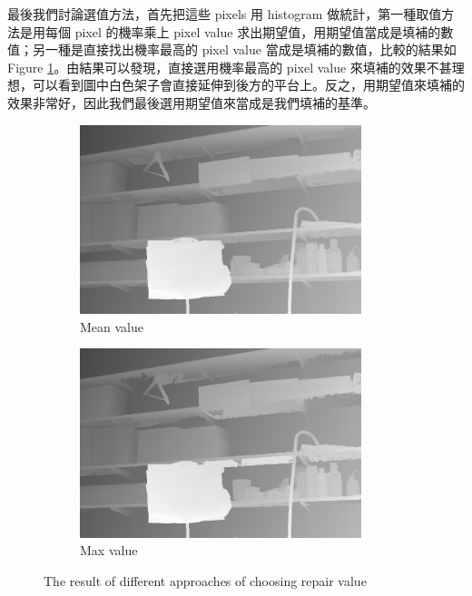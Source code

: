 \documentclass{article}
\begin{document}
\begin{CJK*}{UTF8}{bkai}
最後我們討論選值方法，首先把這些 pixels 用 histogram 做統計，第一種取值方法是用每個 pixel 的機率乘上 pixel value 求出期望值，用期望值當成是填補的數值；另一種是直接找出機率最高的 pixel value 當成是填補的數值，比較的結果如 Figure \ref{fig:result_of_filling_value_test}。由結果可以發現，直接選用機率最高的 pixel value 來填補的效果不甚理想，可以看到圖中白色架子會直接延伸到後方的平台上。反之，用期望值來填補的效果非常好，因此我們最後選用期望值來當成是我們填補的基準。

\begin{figure}[h]
\centering
    \begin{subfigure}{.45\textwidth}
        \centering
        \includegraphics[width=0.9\textwidth]{results/mean.png}
        \caption{Mean value}
    \end{subfigure}
    \begin{subfigure}{.45\textwidth}
        \centering
        \includegraphics[width=0.9\textwidth]{results/max.png}
        \caption{Max value}
    \end{subfigure}
    \caption{The result of different approaches of choosing repair value}
    \label{fig:result_of_filling_value_test}
\end{figure}


\end{CJK*}
\end{document}
